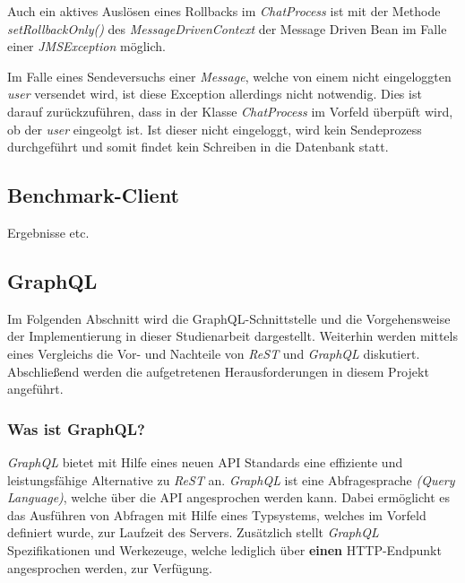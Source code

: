 \documentclass[10pt,journal,compsoc]{IEEEtran}
\begin{document}
Auch ein aktives Auslösen eines Rollbacks im \textit{ChatProcess} ist mit der Methode \textit{setRollbackOnly()} des \textit{MessageDrivenContext} der Message Driven Bean im Falle einer \textit{JMSException} möglich. 

Im Falle eines Sendeversuchs einer \textit{Message}, welche von einem nicht eingeloggten \textit{user} versendet wird, ist diese Exception allerdings nicht notwendig. Dies ist darauf zurückzuführen, dass in der Klasse \textit{ChatProcess} im Vorfeld überpüft wird, ob der \textit{user} eingeolgt ist. Ist dieser nicht eingeloggt, wird kein Sendeprozess durchgeführt und somit findet kein Schreiben in die Datenbank statt. 
\subsection{Benchmark-Client}
Ergebnisse etc. 
\subsection{GraphQL}
Im Folgenden Abschnitt wird die GraphQL-Schnittstelle  und die Vorgehensweise der Implementierung in dieser Studienarbeit dargestellt. Weiterhin werden mittels eines Vergleichs die Vor- und Nachteile von \textit{ReST} und \textit{GraphQL} diskutiert. Abschließend werden die aufgetretenen Herausforderungen in diesem Projekt angeführt.
\subsubsection{Was ist GraphQL?}
\textit{GraphQL} bietet mit Hilfe eines neuen API Standards eine effiziente und leistungsfähige Alternative zu \textit{ReST} an. \textit{GraphQL} ist eine Abfragesprache \textit{(Query Language)}, welche über die API angesprochen werden kann. Dabei ermöglicht es das Ausführen von Abfragen mit Hilfe eines Typsystems, welches im Vorfeld definiert wurde, zur Laufzeit des Servers. Zusätzlich stellt \textit{GraphQL} Spezifikationen und Werkezeuge, welche lediglich über \textbf{einen} HTTP-Endpunkt angesprochen werden, zur Verfügung. \cite{GraphQL:Introduction}
\end{document}
